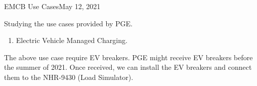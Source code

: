 \begin{entry}{EMCB Use Cases}{May 12, 2021}

\objective \newline
\newline
Studying the use cases provided by PGE.
\begin{enumerate}
    \item Electric Vehicle Managed Charging.
\end{enumerate}
The above use case require EV breakers. PGE might receive EV breakers before the summer of 2021. Once received, we can install the EV breakers and connect them to the NHR-9430 (Load Simulator). 

\end{entry}